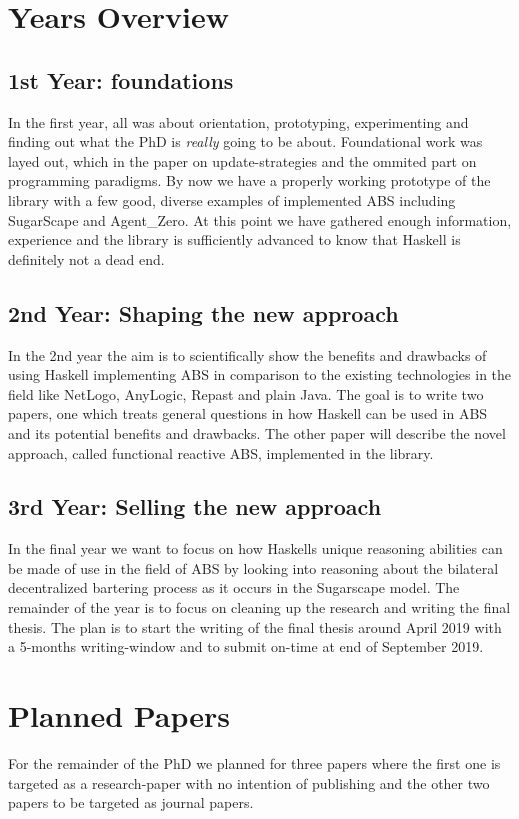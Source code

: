 \section{Years Overview}

\subsection{1st Year: foundations}
In the first year, all was about orientation, prototyping, experimenting and finding out what the PhD is \textit{really} going to be about. Foundational work was layed out, which in the paper on update-strategies and the ommited part on programming paradigms. By now we have a properly working prototype of the library with a few good, diverse examples of implemented ABS including SugarScape and Agent\_Zero. At this point we have gathered enough information, experience and the library is sufficiently advanced to know that Haskell is definitely not a dead end.

\subsection{2nd Year: Shaping the new approach}
In the 2nd year the aim is to scientifically show the benefits and drawbacks of using Haskell implementing ABS in comparison to the existing technologies in the field like NetLogo, AnyLogic, Repast and plain Java. The goal is to write two papers, one which treats general questions in how Haskell can be used in ABS and its potential benefits and drawbacks. The other paper will describe the novel approach, called functional reactive ABS, implemented in the library. 

\subsection{3rd Year: Selling the new approach}
In the final year we want to focus on how Haskells unique reasoning abilities can be made of use in the field of ABS by looking into reasoning about the bilateral decentralized bartering process as it occurs in the Sugarscape model.
The remainder of the year is to focus on cleaning up the research and writing the final thesis. The plan is to start the writing of the final thesis around April 2019 with a 5-months writing-window and to submit on-time at end of September 2019.

\section{Planned Papers}
For the remainder of the PhD we planned for three papers where the first one is targeted as a research-paper with no intention of publishing and the other two papers to be targeted as journal papers.

